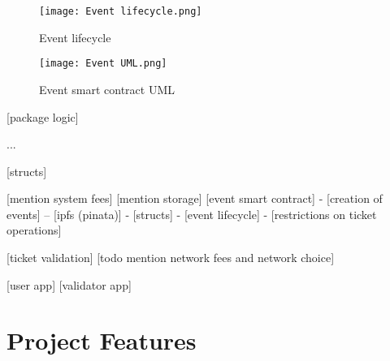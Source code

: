 \begin{figure}[H]
    \texttt{[image: Event lifecycle.png]}
    \centering
    \caption{Event lifecycle}
    \label{fig:event_lifecycle}
\end{figure}



\begin{figure}[H]
    \texttt{[image: Event UML.png]}
    \centering
    \caption{Event smart contract UML}
    \label{fig:event_uml}
\end{figure}

[package logic]

...

    [structs]

    [mention system fees]
    [mention storage]
    [event smart contract]
- [creation of events]
-- [ipfs (pinata)]
- [structs]
- [event lifecycle]
- [restrictions on ticket operations]

[ticket validation]
[todo mention network fees and network choice]

[user app]
[validator app]

\section{Project Features}
\label{sec:project_features}

